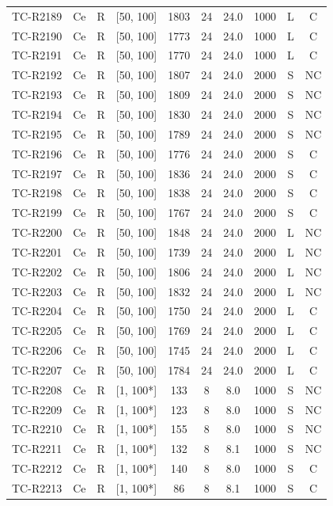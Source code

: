 \begin{longtable}{lccccccccc}
TC-R2189 & Ce & R & [50, 100] & 1803 & 24 & 24.0 & 1000 & L & C \\
TC-R2190 & Ce & R & [50, 100] & 1773 & 24 & 24.0 & 1000 & L & C \\
TC-R2191 & Ce & R & [50, 100] & 1770 & 24 & 24.0 & 1000 & L & C \\
TC-R2192 & Ce & R & [50, 100] & 1807 & 24 & 24.0 & 2000 & S & NC \\
TC-R2193 & Ce & R & [50, 100] & 1809 & 24 & 24.0 & 2000 & S & NC \\
TC-R2194 & Ce & R & [50, 100] & 1830 & 24 & 24.0 & 2000 & S & NC \\
TC-R2195 & Ce & R & [50, 100] & 1789 & 24 & 24.0 & 2000 & S & NC \\
TC-R2196 & Ce & R & [50, 100] & 1776 & 24 & 24.0 & 2000 & S & C \\
TC-R2197 & Ce & R & [50, 100] & 1836 & 24 & 24.0 & 2000 & S & C \\
TC-R2198 & Ce & R & [50, 100] & 1838 & 24 & 24.0 & 2000 & S & C \\
TC-R2199 & Ce & R & [50, 100] & 1767 & 24 & 24.0 & 2000 & S & C \\
TC-R2200 & Ce & R & [50, 100] & 1848 & 24 & 24.0 & 2000 & L & NC \\
TC-R2201 & Ce & R & [50, 100] & 1739 & 24 & 24.0 & 2000 & L & NC \\
TC-R2202 & Ce & R & [50, 100] & 1806 & 24 & 24.0 & 2000 & L & NC \\
TC-R2203 & Ce & R & [50, 100] & 1832 & 24 & 24.0 & 2000 & L & NC \\
TC-R2204 & Ce & R & [50, 100] & 1750 & 24 & 24.0 & 2000 & L & C \\
TC-R2205 & Ce & R & [50, 100] & 1769 & 24 & 24.0 & 2000 & L & C \\
TC-R2206 & Ce & R & [50, 100] & 1745 & 24 & 24.0 & 2000 & L & C \\
TC-R2207 & Ce & R & [50, 100] & 1784 & 24 & 24.0 & 2000 & L & C \\
TC-R2208 & Ce & R & [1, 100*] & 133 & 8 & 8.0 & 1000 & S & NC \\
TC-R2209 & Ce & R & [1, 100*] & 123 & 8 & 8.0 & 1000 & S & NC \\
TC-R2210 & Ce & R & [1, 100*] & 155 & 8 & 8.0 & 1000 & S & NC \\
TC-R2211 & Ce & R & [1, 100*] & 132 & 8 & 8.1 & 1000 & S & NC \\
TC-R2212 & Ce & R & [1, 100*] & 140 & 8 & 8.0 & 1000 & S & C \\
TC-R2213 & Ce & R & [1, 100*] & 86 & 8 & 8.1 & 1000 & S & C \\

\end{longtable}
